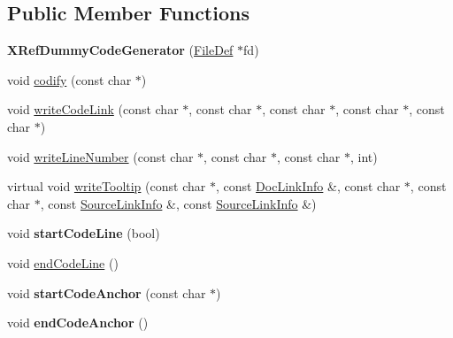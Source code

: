 \subsection*{Public Member Functions}
\begin{DoxyCompactItemize}
\item 
\mbox{\label{class_x_ref_dummy_code_generator_a323a1158e06e05a2676f7c17ebbc33cb}} 
{\bfseries X\+Ref\+Dummy\+Code\+Generator} (\mbox{\hyperlink{class_file_def}{File\+Def}} $\ast$fd)
\item 
void \mbox{\hyperlink{class_x_ref_dummy_code_generator_a81331d5775ec9ff49ef03ebc8c0a0dae}{codify}} (const char $\ast$)
\item 
void \mbox{\hyperlink{class_x_ref_dummy_code_generator_a06d3c79e75348534d7fd21ef2ac17137}{write\+Code\+Link}} (const char $\ast$, const char $\ast$, const char $\ast$, const char $\ast$, const char $\ast$)
\item 
void \mbox{\hyperlink{class_x_ref_dummy_code_generator_a512157ca96e7b26f8b6827362a2a3ba0}{write\+Line\+Number}} (const char $\ast$, const char $\ast$, const char $\ast$, int)
\item 
virtual void \mbox{\hyperlink{class_x_ref_dummy_code_generator_ab174d5a290293c32246eb01ccb937645}{write\+Tooltip}} (const char $\ast$, const \mbox{\hyperlink{struct_doc_link_info}{Doc\+Link\+Info}} \&, const char $\ast$, const char $\ast$, const \mbox{\hyperlink{struct_source_link_info}{Source\+Link\+Info}} \&, const \mbox{\hyperlink{struct_source_link_info}{Source\+Link\+Info}} \&)
\item 
\mbox{\label{class_x_ref_dummy_code_generator_af53c0624cbc5f7a42b8232a3c9255d23}} 
void {\bfseries start\+Code\+Line} (bool)
\item 
void \mbox{\hyperlink{class_x_ref_dummy_code_generator_a6b4a0fd7e9d9b39e05bf65f7dcc1021e}{end\+Code\+Line}} ()
\item 
\mbox{\label{class_x_ref_dummy_code_generator_a631b1d06fec1f66cc11e47aa395133dc}} 
void {\bfseries start\+Code\+Anchor} (const char $\ast$)
\item 
\mbox{\label{class_x_ref_dummy_code_generator_a292b106bc657b26f830db130287afda1}} 
void {\bfseries end\+Code\+Anchor} ()
\item 

\end{DoxyCompactItemize}

